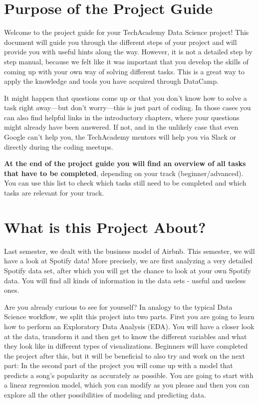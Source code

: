 \documentclass[
  11pt,
]{book}
\begin{document}
\hypertarget{purpose-of-the-project-guide}{%
\section{Purpose of the Project Guide}\label{purpose-of-the-project-guide}}

Welcome to the project guide for your TechAcademy Data Science project! This document will guide you through the different steps of your project and will provide you with useful hints along the way. However, it is not a detailed step by step manual, because we felt like it was important that you develop the skills of coming up with your own way of solving different tasks. This is a great way to apply the knowledge and tools you have acquired through DataCamp.

It might happen that questions come up or that you don't know how to solve a task right away---but don't worry---this is just part of coding. In those cases you can also find helpful links in the introductory chapters, where your questions might already have been answered. If not, and in the unlikely case that even Google can't help you, the TechAcademy mentors will help you via Slack or directly during the coding meetups.

\textbf{At the end of the project guide you will find an overview of all tasks that have to be completed}, depending on your track (beginner/advanced). You can use this list to check which tasks still need to be completed and which tasks are relevant for your track.

\hypertarget{what-is-this-project-about}{%
\section{What is this Project About?}\label{what-is-this-project-about}}

Last semester, we dealt with the business model of Airbnb. This semester, we will have a look at Spotify data! More precisely, we are first analyzing a very detailed Spotify data set, after which you will get the chance to look at your own Spotify data. You will find all kinds of information in the data sets - useful and useless ones.

Are you already curious to see for yourself? In analogy to the typical Data Science workflow, we split this project into two parts. First you are going to learn how to perform an Exploratory Data Analysis (EDA). You will have a closer look at the data, transform it and then get to know the different variables and what they look like in different types of visualizations. Beginners will have completed the project after this, but it will be beneficial to also try and work on the next part: In the second part of the project you will come up with a model that predicts a song's popularity as accurately as possible. You are going to start with a linear regression model, which you can modify as you please and then you can explore all the other possibilities of modeling and predicting data.
\end{document}
